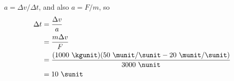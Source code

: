 $a=\Delta v/\Delta t$, and also $a=F/m$, so
\begin{align*}
  \Delta t     &=  \frac{\Delta v}{a}  \\
               &=  \frac{m\Delta v}{F}  \\
               &=  \frac{(1000\ \kgunit)(50\ \munit/\sunit-20\ \munit/\sunit)}{3000\ \nunit}  \\
               &=  10\ \sunit
\end{align*}



